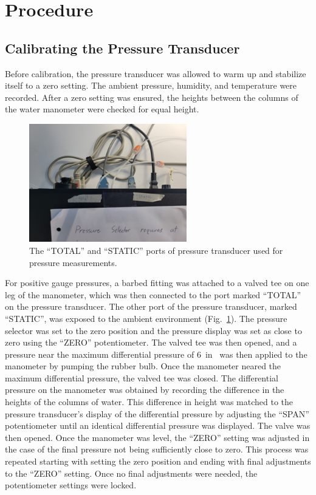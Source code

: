 \documentclass[journal,letterpaper]{IEEEtran}
\begin{document}
\section{Procedure}

\subsection{Calibrating the Pressure Transducer}

Before calibration, the pressure transducer was allowed to warm up and stabilize itself to a zero setting.
The ambient pressure, humidity, and temperature were recorded.
After a zero setting was ensured, the heights between the columns of the water manometer were checked for equal height.

\begin{figure}[H]
    \centering
    \includegraphics[width=2.7in]{transducerPort}
    \caption{The ``TOTAL'' and ``STATIC'' ports of pressure transducer used for pressure measurements.}
    \label{fig:transducerPort}
\end{figure}

For positive gauge pressures, a barbed fitting was attached to a valved tee on one leg of the manometer, which was then connected to the port marked ``TOTAL'' on the pressure transducer.
The other port of the pressure transducer, marked ``STATIC'', was exposed to the ambient environment (Fig.~\ref{fig:transducerPort}).
The pressure selector was set to the zero position and the pressure display was set as close to zero using the ``ZERO'' potentiometer.
The valved tee was then opened, and a pressure near the maximum differential pressure of \qty{6}{in} was then applied to the manometer by pumping the rubber bulb.
Once the manometer neared the maximum differential pressure, the valved tee was closed.
The differential pressure on the manometer was obtained by recording the difference in the heights of the columns of water.
This difference in height was matched to the pressure transducer's display of the differential pressure by adjusting the ``SPAN'' potentiometer until an identical differential pressure was displayed.
The valve was then opened.
Once the manometer was level, the ``ZERO'' setting was adjusted in the case of the final pressure not being sufficiently close to zero.
This process was repeated starting with setting the zero position and ending with final adjustments to the ``ZERO'' setting.
Once no final adjustments were needed, the potentiometer settings were locked.
\end{document}
